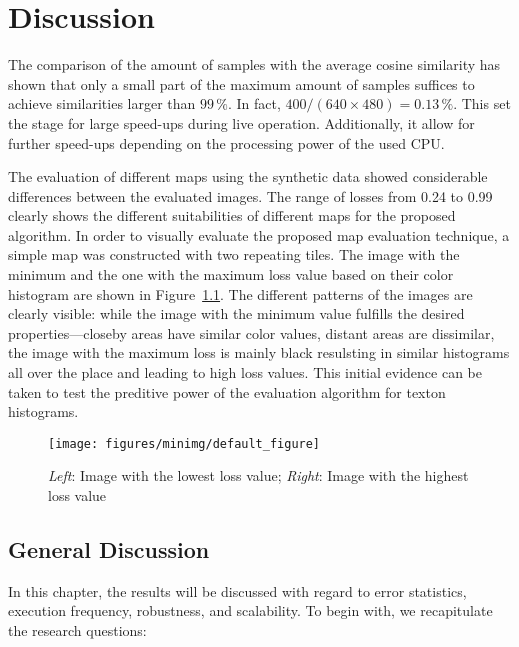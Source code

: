 \chapter{Discussion}
\label{chap:discussion}

The comparison of the amount of samples with the average cosine
similarity has shown that only a small part of the maximum amount of
samples suffices to achieve similarities larger than $99\,\%$. In
fact, $400 / (640 \times 480) = 0.13\,\%$. This set the stage for
large speed-ups during live operation. Additionally, it allow for further speed-ups depending on the processing power of the used
CPU.

The evaluation of different maps using the synthetic data showed
considerable differences between the evaluated images. The range of
losses from 0.24 to 0.99 clearly shows the different suitabilities of different maps for the proposed algorithm. In order to visually evaluate the
proposed map evaluation technique, a simple map was constructed with
two repeating tiles. The image with the minimum and the one with the
maximum loss value based on their color histogram are shown in
Figure~\ref{fig:minmaximg}. The different patterns of the images are
clearly visible: while the image with the minimum value fulfills the
desired properties---closeby areas have similar color values, distant
areas are dissimilar, the image with the maximum loss is mainly black
resulsting in similar histograms all over the place and leading to
high loss values. This initial evidence can be taken to test the
preditive power of the evaluation algorithm for texton histograms.

\begin{figure}[h!]
\begin{center}
\texttt{[image: figures/minimg/default\_figure]}
\caption{{\label{fig:minmaximg} \emph{Left}: Image with the lowest loss value; \emph{Right}:
    Image with the highest loss value%
}}
\end{center}
\end{figure}

\section{General Discussion}
\label{sec:generaldiscussion}

In this chapter, the results will be discussed with regard to error
statistics, execution frequency, robustness, and scalability. To begin
with, we recapitulate the research questions:


